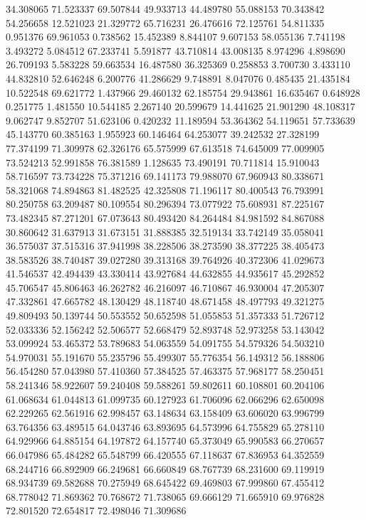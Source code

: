 34.308065
71.523337
69.507844
49.933713
44.489780
55.088153
70.343842
54.256658
12.521023
21.329772
65.716231
26.476616
72.125761
54.811335
0.951376
69.961053
0.738562
15.452389
8.844107
9.607153
58.055136
7.741198
3.493272
5.084512
67.233741
5.591877
43.710814
43.008135
8.974296
4.898690
26.709193
5.583228
59.663534
16.487580
36.325369
0.258853
3.700730
3.433110
44.832810
52.646248
6.200776
41.286629
9.748891
8.047076
0.485435
21.435184
10.522548
69.621772
1.437966
29.460132
62.185754
29.943861
16.635467
0.648928
0.251775
1.481550
10.544185
2.267140
20.599679
14.441625
21.901290
48.108317
9.062747
9.852707
51.623106
0.420232
11.189594
53.364362
54.119651
57.733639
45.143770
60.385163
1.955923
60.146464
64.253077
39.242532
27.328199
77.374199
71.309978
62.326176
65.575999
67.613518
74.645009
77.009905
73.524213
52.991858
76.381589
1.128635
73.490191
70.711814
15.910043
58.716597
73.734228
75.371216
69.141173
79.988070
67.960943
80.338671
58.321068
74.894863
81.482525
42.325808
71.196117
80.400543
76.793991
80.250758
63.209487
80.109554
80.296394
73.077922
75.608931
87.225167
73.482345
87.271201
67.073643
80.493420
84.264484
84.981592
84.867088
30.860642
31.637913
31.673151
31.888385
32.519134
33.742149
35.058041
36.575037
37.515316
37.941998
38.228506
38.273590
38.377225
38.405473
38.583526
38.740487
39.027280
39.313168
39.764926
40.372306
41.029673
41.546537
42.494439
43.330414
43.927684
44.632855
44.935617
45.292852
45.706547
45.806463
46.262782
46.216097
46.710867
46.930004
47.205307
47.332861
47.665782
48.130429
48.118740
48.671458
48.497793
49.321275
49.809493
50.139744
50.553552
50.652598
51.055853
51.357333
51.726712
52.033336
52.156242
52.506577
52.668479
52.893748
52.973258
53.143042
53.099924
53.465372
53.789683
54.063559
54.091755
54.579326
54.503210
54.970031
55.191670
55.235796
55.499307
55.776354
56.149312
56.188806
56.454280
57.043980
57.410360
57.384525
57.463375
57.968177
58.250451
58.241346
58.922607
59.240408
59.588261
59.802611
60.108801
60.204106
61.068634
61.044813
61.099735
60.127923
61.706096
62.066296
62.650098
62.229265
62.561916
62.998457
63.148634
63.158409
63.606020
63.996799
63.764356
63.489515
64.043746
63.893695
64.573996
64.755829
65.278110
64.929966
64.885154
64.197872
64.157740
65.373049
65.990583
66.270657
66.047986
65.484282
65.548799
66.420555
67.118637
67.836953
64.352559
68.244716
66.892909
66.249681
66.660849
68.767739
68.231600
69.119919
68.934739
69.582688
70.275949
68.645422
69.469803
67.999860
67.455412
68.778042
71.869362
70.768672
71.738065
69.666129
71.665910
69.976828
72.801520
72.654817
72.498046
71.309686

